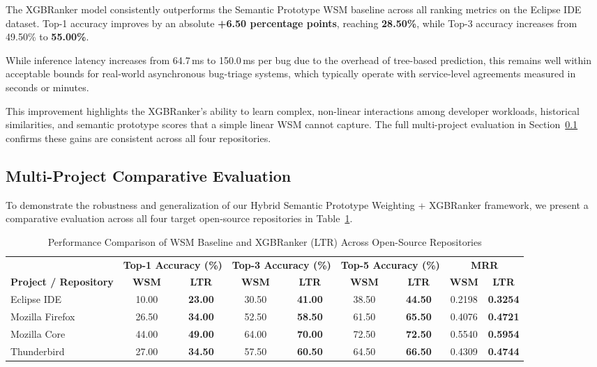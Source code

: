 \documentclass[sigconf,review,anonymous]{acmart}
\begin{document}
The XGBRanker model consistently outperforms the Semantic Prototype WSM
baseline across all ranking metrics on the Eclipse IDE dataset.
Top-1 accuracy improves by an absolute \textbf{+6.50 percentage points},
reaching \textbf{28.50\%}, while Top-3 accuracy increases from 49.50\% to
\textbf{55.00\%}.

While inference latency increases from 64.7\,ms to 150.0\,ms per bug due to
the overhead of tree-based prediction, this remains well within acceptable
bounds for real-world asynchronous bug-triage systems, which typically operate
with service-level agreements measured in seconds or minutes.

This improvement highlights the XGBRanker's ability to learn complex,
non-linear interactions among developer workloads, historical similarities,
and semantic prototype scores that a simple linear WSM cannot capture.
The full multi-project evaluation in Section~\ref{subsec:multiproject}
confirms these gains are consistent across all four repositories.

\subsection{Multi-Project Comparative Evaluation}
\label{subsec:multiproject}

To demonstrate the robustness and generalization of our Hybrid Semantic Prototype Weighting + XGBRanker framework, we present a comparative evaluation across all four target open-source repositories in Table~\ref{tab:multi_project_results}.

\begin{table}[t]
\centering
\caption{Performance Comparison of WSM Baseline and XGBRanker (LTR) Across Open-Source Repositories}
\label{tab:multi_project_results}
\renewcommand{\arraystretch}{1.2}
\begin{tabular}{lcccccccc}
\toprule
 & \multicolumn{2}{c}{\textbf{Top-1 Accuracy (\%)}} & \multicolumn{2}{c}{\textbf{Top-3 Accuracy (\%)}} & \multicolumn{2}{c}{\textbf{Top-5 Accuracy (\%)}} & \multicolumn{2}{c}{\textbf{MRR}} \\
\cmidrule(lr){2-3} \cmidrule(lr){4-5} \cmidrule(lr){6-7} \cmidrule(lr){8-9}
\textbf{Project / Repository} & \textbf{WSM} & \textbf{LTR} & \textbf{WSM} & \textbf{LTR} & \textbf{WSM} & \textbf{LTR} & \textbf{WSM} & \textbf{LTR} \\
\midrule
Eclipse IDE & 10.00 & \textbf{23.00} & 30.50 & \textbf{41.00} & 38.50 & \textbf{44.50} & 0.2198 & \textbf{0.3254} \\
Mozilla Firefox & 26.50 & \textbf{34.00} & 52.50 & \textbf{58.50} & 61.50 & \textbf{65.50} & 0.4076 & \textbf{0.4721} \\
Mozilla Core & 44.00 & \textbf{49.00} & 64.00 & \textbf{70.00} & 72.50 & \textbf{72.50} & 0.5540 & \textbf{0.5954} \\
Thunderbird & 27.00 & \textbf{34.50} & 57.50 & \textbf{60.50} & 64.50 & \textbf{66.50} & 0.4309 & \textbf{0.4744} \\
\bottomrule
\end{tabular}
\end{table}
\end{document}
